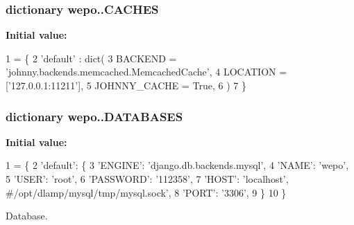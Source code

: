 \hypertarget{namespacewepo_1_1_afa323209f988a07e83cb8ecfe8c80543}{
\subsubsection[{C\-A\-C\-H\-E\-S}]{\setlength{\rightskip}{0pt plus 5cm}dictionary wepo..\-C\-A\-C\-H\-E\-S}}\label{namespacewepo_1_1_afa323209f988a07e83cb8ecfe8c80543}
{\bfseries Initial value\-:}
\begin{DoxyCode}
1 = \{
2    \textcolor{stringliteral}{'default'} : dict(
3       BACKEND = \textcolor{stringliteral}{'johnny.backends.memcached.MemcachedCache'},
4       LOCATION = [\textcolor{stringliteral}{'127.0.0.1:11211'}],
5       JOHNNY\_CACHE = \textcolor{keyword}{True},
6    )
7 \}
\end{DoxyCode}
\hypertarget{namespacewepo_1_1_a6ffb857fa446232323e5cbe4f5925789}{
\subsubsection[{D\-A\-T\-A\-B\-A\-S\-E\-S}]{\setlength{\rightskip}{0pt plus 5cm}dictionary wepo..\-D\-A\-T\-A\-B\-A\-S\-E\-S}}\label{namespacewepo_1_1_a6ffb857fa446232323e5cbe4f5925789}
{\bfseries Initial value\-:}
\begin{DoxyCode}
1 = \{
2    \textcolor{stringliteral}{'default'}: \{
3       \textcolor{stringliteral}{'ENGINE'}:   \textcolor{stringliteral}{'django.db.backends.mysql'},
4       \textcolor{stringliteral}{'NAME'}:     \textcolor{stringliteral}{'wepo'},
5       \textcolor{stringliteral}{'USER'}:     \textcolor{stringliteral}{'root'},
6       \textcolor{stringliteral}{'PASSWORD'}: \textcolor{stringliteral}{'112358'},
7       \textcolor{stringliteral}{'HOST'}:     \textcolor{stringliteral}{'localhost'}, \textcolor{comment}{#/opt/dlamp/mysql/tmp/mysql.sock',}
8       \textcolor{stringliteral}{'PORT'}:     \textcolor{stringliteral}{'3306'},
9    \}
10 \}
\end{DoxyCode}


Database. 

